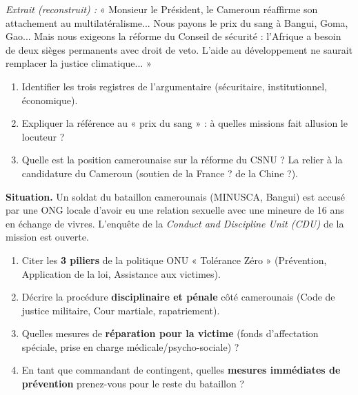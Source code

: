 \documentclass[11pt]{article}
\begin{document}
\begin{exercice}
\textit{Extrait (reconstruit) :} « Monsieur le Président, le Cameroun réaffirme son attachement au multilatéralisme... Nous payons le prix du sang à Bangui, Goma, Gao... Mais nous exigeons la réforme du Conseil de sécurité : l'Afrique a besoin de deux sièges permanents avec droit de veto. L'aide au développement ne saurait remplacer la justice climatique... »
\begin{enumerate}
    \item Identifier les trois registres de l'argumentaire (sécuritaire, institutionnel, économique).
    \item Expliquer la référence au « prix du sang » : à quelles missions fait allusion le locuteur ?
    \item Quelle est la position camerounaise sur la réforme du CSNU ? La relier à la candidature du Cameroun (soutien de la France ? de la Chine ?).
\end{enumerate}
\end{exercice}

\begin{exercice}
\textbf{Situation.} Un soldat du bataillon camerounais (MINUSCA, Bangui) est accusé par une ONG locale d'avoir eu une relation sexuelle avec une mineure de 16 ans en échange de vivres. L'enquête de la \emph{Conduct and Discipline Unit (CDU)} de la mission est ouverte.
\begin{enumerate}
    \item Citer les \textbf{3 piliers} de la politique ONU « Tolérance Zéro » (Prévention, Application de la loi, Assistance aux victimes).
    \item Décrire la procédure \textbf{disciplinaire et pénale} côté camerounais (Code de justice militaire, Cour martiale, rapatriement).
    \item Quelles mesures de \textbf{réparation pour la victime} (fonds d'affectation spéciale, prise en charge médicale/psycho-sociale) ?
    \item En tant que commandant de contingent, quelles \textbf{mesures immédiates de prévention} prenez-vous pour le reste du bataillon ?
\end{enumerate}
\end{exercice}
\end{document}
